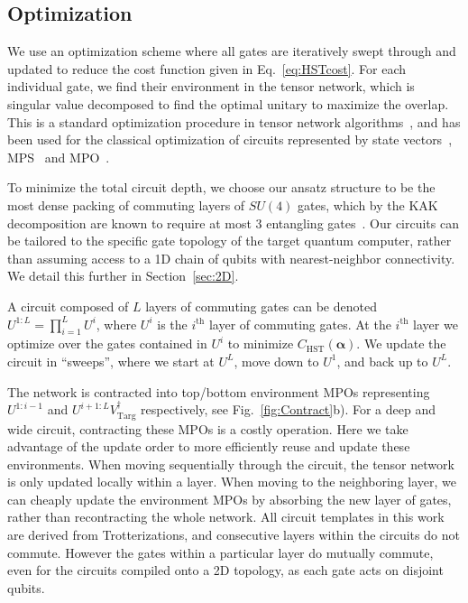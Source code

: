 \documentclass[a4paper,twocolumn,11pt,accepted=2025-06-10]{quantumarticle}
\renewcommand{\vec}[1]{\boldsymbol{#1}}
\begin{document}
\subsection{Optimization}

We use an optimization scheme where all gates are iteratively swept through and updated to reduce the cost function given in Eq.~\eqref{eq:HSTcost}. For each individual gate, we find their environment in the tensor network, which is singular value decomposed to find the optimal unitary to maximize the overlap.  This is a standard optimization procedure in tensor network algorithms~\cite{evenbly2009algorithms}, and has been used for the classical optimization of circuits represented by state vectors~\cite{kukliansky2023qfactor, shirakawa2021automatic, kukliansky2024leveraging},  MPS~\cite{rudolph2022decomposition, anselme2024combining} and MPO~\cite{causer2023scalable, anselme2024combining}.

To minimize the total circuit depth, we choose our ansatz structure to be the most dense packing of commuting layers of $SU(4)$ gates, which by the KAK decomposition are known to require at most 3 entangling gates~\cite{tucci2005introduction}. Our circuits can be tailored to the specific gate topology of the target quantum computer, rather than assuming access to a 1D chain of qubits with nearest-neighbor connectivity. We detail this further in Section~\ref{sec:2D}.


A circuit composed of $L$ layers of commuting gates can be denoted $U^{1:L} = \prod_{i=1}^L U^i$, where $U^i$ is the $i^{\text{th}}$ layer of commuting gates. At the $i^{\text{th}}$ layer we optimize over the gates contained in $U^{i}$ to minimize $C_{\text{HST}}(\vec{\alpha})$.
We update the circuit in ``sweeps'', where we start at $U^L$, move down to $U^1$, and back up to $U^L$. 

The network is contracted into top/bottom environment MPOs representing $U^{1:i-1}$ and $U^{i+1:L} V_\mathrm{Targ}^{\dagger}$ respectively, see Fig.~\ref{fig:Contract}b). For a deep and wide circuit, contracting these MPOs is a costly operation. Here we take advantage of the update order to more efficiently reuse and update these environments. When moving sequentially through the circuit, the tensor network is only updated locally within a layer. When moving to the neighboring layer, we can cheaply update the environment MPOs by absorbing the new layer of gates, rather than recontracting the whole network. 
All circuit templates in this work are derived from Trotterizations, and consecutive layers within the circuits do not commute. However the gates within a particular layer do mutually commute, even for the circuits compiled onto a 2D topology, as each gate acts on disjoint qubits.
\end{document}

